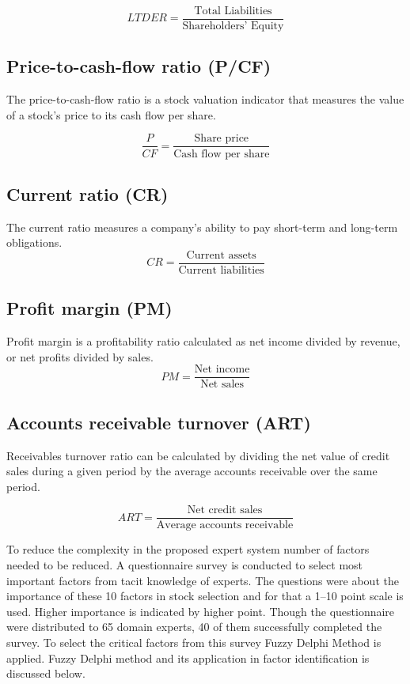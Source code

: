 \documentclass{ws-ijufks}
\begin{document}
\begin{equation*}
LTDER=\frac{\textrm{Total Liabilities}}{\textrm{Shareholders' Equity}}
\end{equation*}

\subsection*{Price-to-cash-flow ratio (P/CF)}
The price-to-cash-flow ratio is a stock valuation indicator that measures the value of a 
stock's price to its cash flow per share.

\begin{equation*}
\frac{P}{CF}=\frac{\textrm{Share price}}{\textrm{Cash flow per share}}
\end{equation*}

\subsection*{Current ratio (CR)}
The current ratio measures a company's ability to pay short-term and long-term 
obligations.
\begin{equation*}
CR=\frac{\textrm{Current assets}}{\textrm{Current liabilities}}
\end{equation*}

\subsection*{Profit margin (PM)}
Profit margin is a profitability ratio calculated as net income divided by revenue, or 
net profits divided by sales. 
\begin{equation*}
PM=\frac{\textrm{Net income}}{\textrm{Net sales}}
\end{equation*}

\subsection*{Accounts receivable turnover (ART)}
Receivables turnover ratio can be calculated by dividing the net value of credit sales 
during a given period by the average accounts receivable over the same period.

\begin{equation*}
ART=\frac{\textrm{Net credit sales}}{\textrm{Average accounts receivable}}
\end{equation*}

To reduce the complexity in the proposed expert system number of factors 
needed to be reduced. A questionnaire survey is conducted to select most important 
factors from tacit knowledge of experts. The questions were about the importance of these 
10 factors in stock selection and for that a 1--10 point scale is used. Higher importance 
is indicated by higher point. Though the questionnaire were distributed to 65 domain 
experts, 40 of them successfully completed the survey. To select the critical factors 
from this survey Fuzzy Delphi Method \cite{Hsu2000} is applied. Fuzzy Delphi method and 
its application in factor identification is discussed below.
\end{document}
